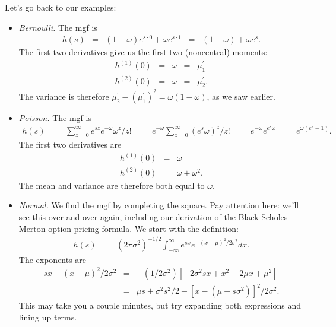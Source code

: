 Let's go back to our examples:
%
\begin{itemize}
\item {\it Bernoulli.\/}
The mgf is
\begin{eqnarray*}
    h(s) &=& (1-\omega) e^{s \cdot 0} + \omega e^{s \cdot 1}
        \;\;=\;\; (1-\omega) + \omega e^{s} .
\end{eqnarray*}
The first two derivatives give us the first two (noncentral) moments:
\begin{eqnarray*}
    h^{(1)}(0) &=& \omega \;\;=\;\; \mu_1^\prime \\
    h^{(2)}(0) &=& \omega \;\;=\;\; \mu_2^\prime.
\end{eqnarray*}
The variance is therefore $\mu_2^\prime - (\mu_1^\prime)^2 = \omega (1-\omega)$, as we saw earlier.

\item {\it Poisson.\/}  The mgf is
\begin{eqnarray*}
    h(s) &=& \sum_{z=0}^\infty e^{sz} e^{-\omega} \omega^z/z!
            \;\;=\;\; e^{-\omega} \sum_{z=0}^\infty \left( e^{s} \omega\right)^z /z!
            \;\;=\;\; e^{-\omega} e^{e^{s} \omega}
            \;\;=\;\; e^{\omega (e^{s}-1)}  .
\end{eqnarray*}
The first two derivatives are
\begin{eqnarray*}
    h^{(1)}(0) &=& \omega  \\
    h^{(2)}(0) &=& \omega + \omega^2 .
\end{eqnarray*}
The mean and variance are therefore both equal to $\omega$.

\item {\it Normal.\/}
We find the mgf by completing the square.
Pay attention here:  we'll see this over and over again, including our derivation
of the Black-Scholes-Merton option pricing formula.
We start with the definition:
\begin{eqnarray*}
        h(s) &=& (2\pi \sigma^2)^{-1/2} \int_{-\infty}^\infty e^{sx} e^{-(x-\mu)^2/2\sigma^2} dx .
\end{eqnarray*}
The exponents are
\begin{eqnarray}
        sx - (x-\mu)^2/2\sigma^2 &=&
                -(1/2\sigma^2) \left[ -2 \sigma^2 s x + x^2 - 2 \mu x + \mu^2  \right]
                        \nonumber \\
            &=& \mu s + \sigma^2 s^2/2 - [x-(\mu+s \sigma^2)]^2/2\sigma^2 .
            \label{eq:complete-the-square}
\end{eqnarray}
This may take you a couple minutes,  but try expanding both expressions and lining up terms.


\end{itemize}
